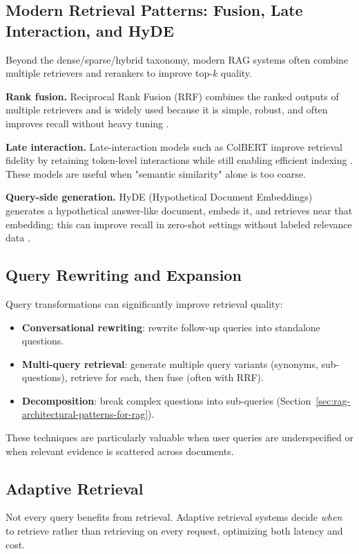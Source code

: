 \subsection{Modern Retrieval Patterns: Fusion, Late Interaction, and HyDE}
Beyond the dense/sparse/hybrid taxonomy, modern RAG systems often combine multiple retrievers and rerankers to improve top-$k$ quality.

\textbf{Rank fusion.} Reciprocal Rank Fusion (RRF) combines the ranked outputs of multiple retrievers and is widely used because it is simple, robust, and often improves recall without heavy tuning \cite{cormack2009rrf}.

\textbf{Late interaction.} Late-interaction models such as ColBERT improve retrieval fidelity by retaining token-level interactions while still enabling efficient indexing \cite{khattab2020colbert,Zhan2021ColBERTv2}. These models are useful when "semantic similarity" alone is too coarse.

\textbf{Query-side generation.} HyDE (Hypothetical Document Embeddings) generates a hypothetical answer-like document, embeds it, and retrieves near that embedding; this can improve recall in zero-shot settings without labeled relevance data \cite{gao2023hyde}.

\subsection{Query Rewriting and Expansion}
Query transformations can significantly improve retrieval quality:
\begin{itemize}
    \item \textbf{Conversational rewriting}: rewrite follow-up queries into standalone questions.
    \item \textbf{Multi-query retrieval}: generate multiple query variants (synonyms, sub-questions), retrieve for each, then fuse (often with RRF).
    \item \textbf{Decomposition}: break complex questions into sub-queries (Section~\ref{sec:rag-architectural-patterns-for-rag}).
\end{itemize}
These techniques are particularly valuable when user queries are underspecified or when relevant evidence is scattered across documents.

\subsection{Adaptive Retrieval}
\label{sec:rag-adaptive-retrieval}
Not every query benefits from retrieval. Adaptive retrieval systems decide \emph{when} to retrieve rather than retrieving on every request, optimizing both latency and cost.

